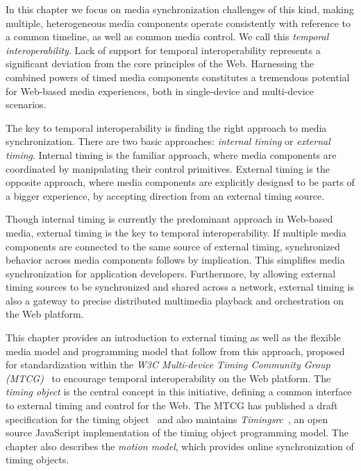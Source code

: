 \documentclass[graybox]{svmult}
\begin{document}
In this chapter we focus on media synchronization challenges of this kind,
making multiple, heterogeneous media components operate consistently with
reference to a common timeline, as well as common media control. We call this
\emph{temporal interoperability}. Lack of support for temporal
interoperability represents a significant deviation from the core principles
of the Web. Harnessing the combined powers of timed media components
constitutes a tremendous potential for Web-based media experiences, both in
single-device and multi-device scenarios.

The key to temporal interoperability is finding the right approach to media
synchronization. There are two basic approaches: \emph{internal
timing} or \emph{external timing}. Internal timing
is the familiar approach, where media components are coordinated by
manipulating their control primitives. External timing is the
opposite approach, where media components are explicitly designed to be parts
of a bigger experience, by accepting direction from an external timing source.

Though internal timing is currently the predominant approach in Web-based media, 
external timing is the key to temporal interoperability.
If multiple media components are connected to the same source of external timing,
synchronized behavior across media components follows by implication. This
simplifies media synchronization for application developers. Furthermore,
by allowing external timing sources to be synchronized and shared across a
network, external timing is also a gateway to precise distributed multimedia
playback and orchestration on the Web platform.

This chapter provides an introduction to external timing as well as the
flexible media model and programming model that follow from this approach,
proposed for standardization within the \emph{W3C Multi-device Timing
Community Group (MTCG)}~\cite{mtcg} to encourage temporal interoperability on
the Web platform. The \emph{timing object} is the central concept in this
initiative, defining a common interface to external timing and control for the
Web. The MTCG has published a draft specification for the timing
object~\cite{timingobject} and also maintains
\emph{Timingsrc}~\cite{timingsrc}, an open source JavaScript implementation of
the timing object programming model. The chapter also describes the
\emph{motion model}, which provides online synchronization of timing objects.
\end{document}
